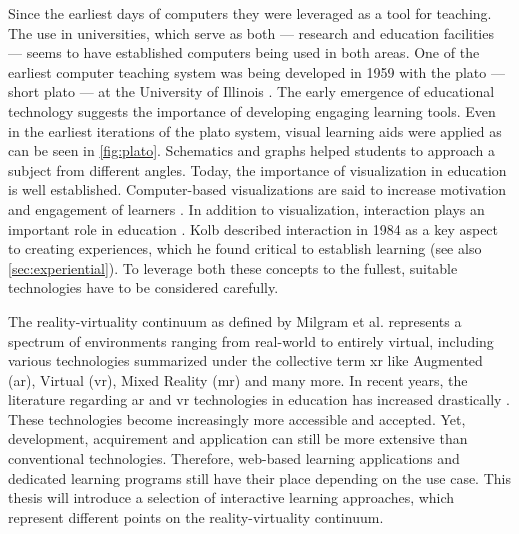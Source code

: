 Since the earliest days of computers they were leveraged as a tool for teaching.
The use in universities, which serve as both --- research and education facilities --- seems to have established computers being used in both areas.
One of the earliest computer teaching system was being developed in 1959 with the \acrlong{plato} --- short \acrshort{plato} --- at the University of Illinois \cite{cope2023history}.
The early emergence of educational technology suggests the importance of developing engaging learning tools.
Even in the earliest iterations of the \acrshort{plato} system, visual learning aids were applied as can be seen in \autoref{fig:plato}.
Schematics and graphs helped students to approach a subject from different angles.
Today, the importance of visualization in education is well established.
Computer-based visualizations are said to increase motivation and engagement of learners \cite{vavra2011visualization}.
In addition to visualization, interaction plays an important role in education \cite{firat2018towards}.
Kolb described interaction in 1984 \cite{kolb:1984:experiential} as a key aspect to creating experiences, which he found critical to establish learning (see also \autoref{sec:experiential}).
To leverage both these concepts to the fullest, suitable technologies have to be considered carefully.

The reality-virtuality continuum as defined by Milgram et al. \cite{milgram1994arc} represents a spectrum of environments ranging from real-world to entirely virtual, including various technologies summarized under the collective term \acrfull{xr} like Augmented (\acrshort{ar}), Virtual (\acrshort{vr}), Mixed Reality (\acrshort{mr}) and many more.
In recent years, the literature regarding \acrshort{ar} and \acrshort{vr} technologies in education has increased drastically \cite{alansi2023analyzing}.
These technologies become increasingly more accessible and accepted.
Yet, development, acquirement and application can still be more extensive than conventional technologies.
Therefore, web-based learning applications and dedicated learning programs still have their place depending on the use case.
This thesis will introduce a selection of interactive learning approaches, which represent different points on the reality-virtuality continuum. 

